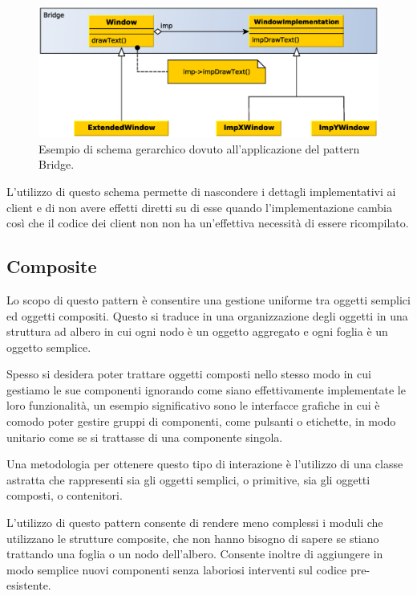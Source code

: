 \begin{figure}
\begin{center}
\includegraphics[width=12cm]{Immagini/BridgePattern}
\caption{Esempio di schema gerarchico dovuto all'applicazione del pattern Bridge.\label{f:bridgepattern}} 
\end{center} 
\end{figure}

L'utilizzo di questo schema permette di nascondere i dettagli implementativi ai client e di non avere effetti diretti su di esse quando l'implementazione cambia così che il codice dei client non non ha un'effettiva necessità di essere ricompilato. 

\subsection{Composite}
\label{sub:composite}
Lo scopo di questo pattern è consentire una gestione uniforme tra oggetti semplici ed oggetti compositi. Questo si traduce in una organizzazione degli oggetti in una struttura ad albero in cui ogni nodo è un oggetto aggregato e ogni foglia è un oggetto semplice.

Spesso si desidera poter trattare oggetti composti nello stesso modo in cui gestiamo le sue componenti ignorando come siano effettivamente implementate le loro funzionalità, un esempio significativo sono le interfacce grafiche in cui è comodo poter gestire gruppi di componenti, come pulsanti o etichette, in modo unitario come se si trattasse di una componente singola.

Una metodologia per ottenere questo tipo di interazione è l'utilizzo di una classe astratta che rappresenti sia gli oggetti semplici, o primitive, sia gli oggetti composti, o contenitori.

L'utilizzo di questo pattern consente di rendere meno complessi i moduli che utilizzano le strutture composite, che non hanno bisogno di sapere se stiano trattando una foglia o un nodo dell'albero. Consente inoltre di aggiungere in modo semplice nuovi componenti senza laboriosi interventi sul codice pre-esistente.
